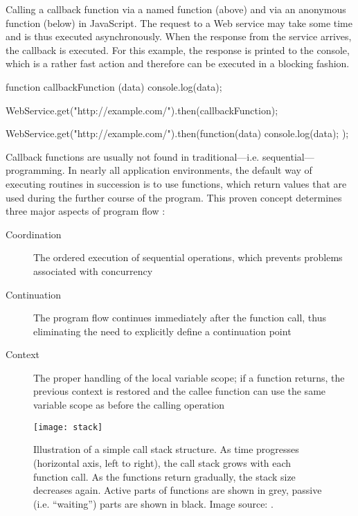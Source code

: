\begin{program}
  \caption{Calling a callback function via a named function (above) and via an anonymous function (below) in JavaScript. The request to a Web service may take some time and is thus executed asynchronously. When the response from the service arrives, the callback is executed. For this example, the response is printed to the console, which is a rather fast action and therefore can be executed in a blocking fashion.}
  \label{prog:callback}
  \begin{JavaCode}
function callbackFunction (data) {
    console.log(data);
}
  
WebService.get("http://example.com/").then(callbackFunction);
  \end{JavaCode}
\begin{JavaCode}
WebService.get("http://example.com/").then(function(data) {
    console.log(data);
});
  \end{JavaCode}
\end{program}

Callback functions are usually not found in traditional---i.e. sequential---programming. In nearly all application environments, the default way of executing routines in succession is to use functions, which return values that are used during the further course of the program. This proven concept determines three major aspects of program flow \cite[p. 3]{Hohpe2006}:

\begin{description}
  \item[Coordination] The ordered execution of sequential operations, which prevents problems associated with concurrency
  \item[Continuation] The program flow continues immediately after the function call, thus eliminating the need to explicitly define a continuation point
  \item[Context] The proper handling of the local variable scope; if a function returns, the previous context is restored and the callee function can use the same variable scope as before the calling operation  
\end{description}

\begin{figure}
\centering\small
\setlength{\tabcolsep}{0mm}
  \texttt{[image: stack]}
\caption{
Illustration of a simple call stack structure. As time progresses (horizontal axis, left to right), the call stack grows with each function call. As the functions return gradually, the stack size decreases again. Active parts of functions are shown in grey, passive (i.e. ``waiting'') parts are shown in black. Image source: \cite{Hohpe2006}.
}
\label{fig:stack}
\end{figure}

